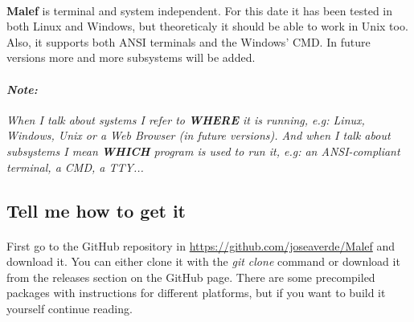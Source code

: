    \paragraph{}
      \textbf{Malef} is terminal and system independent. For this date it has
   been tested in both Linux and Windows, but theoreticaly it should be able to
   work in Unix too. Also, it supports both ANSI terminals and the Windows'
   CMD. In future versions more and more subsystems will be added.

   \paragraph{\textit{Note:}} \textit{
      When I talk about systems I refer to \textbf{WHERE} it is running, e.g:
   Linux, Windows, Unix or a Web Browser (in future versions). And when I talk
   about subsystems I mean \textbf{WHICH} program is used to run it, e.g:
   an ANSI-compliant terminal, a CMD, a TTY...}

   \subsection{Tell me how to get it}
   \paragraph{}
      First go to the GitHub repository in
   \url{https://github.com/joseaverde/Malef} and download it. You can either
   clone it with the \textit {git clone} command or download it from the
   releases section on the GitHub page. There are some precompiled packages
   with instructions for different platforms, but if you want to build it
   yourself continue reading.

